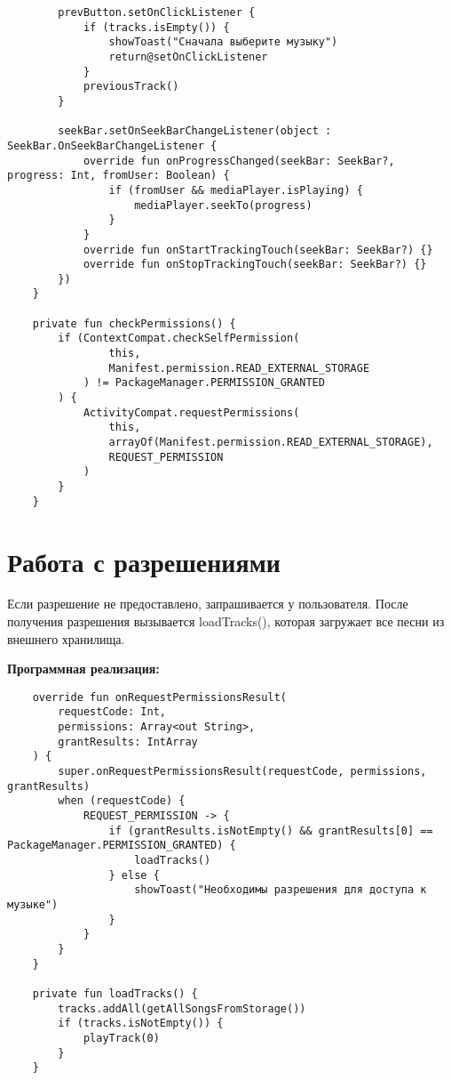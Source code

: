 \begin{verbatim}
        prevButton.setOnClickListener {
            if (tracks.isEmpty()) {
                showToast("Сначала выберите музыку")
                return@setOnClickListener
            }
            previousTrack()
        }

        seekBar.setOnSeekBarChangeListener(object : SeekBar.OnSeekBarChangeListener {
            override fun onProgressChanged(seekBar: SeekBar?, progress: Int, fromUser: Boolean) {
                if (fromUser && mediaPlayer.isPlaying) {
                    mediaPlayer.seekTo(progress)
                }
            }
            override fun onStartTrackingTouch(seekBar: SeekBar?) {}
            override fun onStopTrackingTouch(seekBar: SeekBar?) {}
        })
    }

    private fun checkPermissions() {
        if (ContextCompat.checkSelfPermission(
                this,
                Manifest.permission.READ_EXTERNAL_STORAGE
            ) != PackageManager.PERMISSION_GRANTED
        ) {
            ActivityCompat.requestPermissions(
                this,
                arrayOf(Manifest.permission.READ_EXTERNAL_STORAGE),
                REQUEST_PERMISSION
            )
        }
    }
\end{verbatim}

\section{Работа с разрешениями}

Если разрешение не предоставлено, запрашивается у пользователя. После получения разрешения вызывается loadTracks(), которая загружает все песни из внешнего хранилища.

\textbf{Программная реализация:}
\begin{verbatim}
	override fun onRequestPermissionsResult(
        requestCode: Int,
        permissions: Array<out String>,
        grantResults: IntArray
    ) {
        super.onRequestPermissionsResult(requestCode, permissions, grantResults)
        when (requestCode) {
            REQUEST_PERMISSION -> {
                if (grantResults.isNotEmpty() && grantResults[0] == PackageManager.PERMISSION_GRANTED) {
                    loadTracks()
                } else {
                    showToast("Необходимы разрешения для доступа к музыке")
                }
            }
        }
    }

    private fun loadTracks() {
        tracks.addAll(getAllSongsFromStorage())
        if (tracks.isNotEmpty()) {
            playTrack(0)
        }
    }
\end{verbatim}

